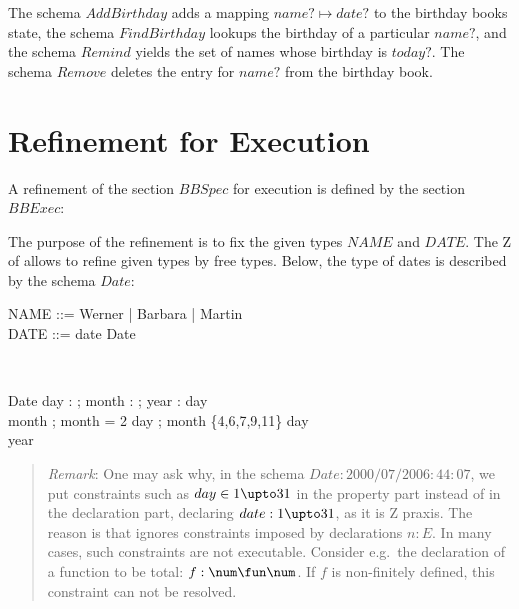 \documentclass{article}
\newenvironment{remark}
{\begin{small}\begin{quote}\emph{Remark}: }{\end{quote}\end{small}}
\begin{document}
The schema $AddBirthday$ adds a mapping $name? \mapsto date?$ to
the birthday books state, the schema $FindBirthday$ lookups the
birthday of a particular $name?$, and the schema $Remind$ yields
the set of names whose birthday is $today?$. The schema $Remove$
deletes the entry for $name?$ from the birthday book. 

\section{Refinement for Execution}

A refinement of the section $BBSpec$ for execution is defined by the
section $BBExec$:

\begin{zdirectives}
\end{zdirectives}


The purpose of the refinement is to fix the given types $NAME$ and
$DATE$. The Z of \Zeta{} allows to refine given
types by free types. Below, the type of dates is described by the
schema ${}Date$:

\begin{zedgroup}
\begin{zed}
  NAME ::= Werner | Barbara | Martin\\
  DATE ::= date \ldata Date \rdata \\
\end{zed} \\

\begin{schema}{Date}
  day : \nat;
  month : \nat;
  year : \nat
\where
  day   \\
  month  ;
  month = 2 \implies day ;
  month \in \{4,6,7,9,11\} \implies day  \\
  year 
\end{schema}
\end{zedgroup}

\begin{remark}
  One may ask why, in the schema $Date: 2000/07/20 06:44:07 $, we put constraints such as
  $day \in 1 \upto 31$ in the property part instead of in the
  declaration part, declaring $date: 1 \upto 31$, as it is Z praxis.
  The reason is that \ZAP{} ignores constraints imposed by
  declarations $n:E$. In many cases, such constraints are not
  executable. Consider e.g.~the declaration of a function to be total:
  $f: \num \fun \num$. If $f$ is non-finitely defined, this constraint
  can not be resolved.
\end{remark}
\end{document}
